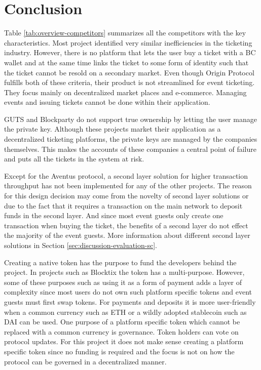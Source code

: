 \section{Conclusion}

Table \ref{tab:overview-competitors} summarizes all the competitors with the key characteristics. Most project identified very similar inefficiencies in the ticketing industry. However, there is no platform that lets the user buy a ticket with a BC wallet and at the same time links the ticket to some form of identity such that the ticket cannot be resold on a secondary market. Even though Origin Protocol fulfills both of these criteria, their product is not streamlined for event ticketing. They focus mainly on decentralized market places and e-commerce. Managing events and issuing tickets cannot be done within their application.

GUTS and Blockparty do not support true ownership by letting the user manage the private key. Although these projects market their application as a decentralized ticketing platforms, the private keys are managed by the companies themselves. This makes the accounts of these companies a central point of failure and puts all the tickets in the system at risk.

Except for the Aventus protocol, a second layer solution for higher transaction throughput has not been implemented for any of the other projects. The reason for this design decision may come from the novelty of second layer solutions or due to the fact that it requires a transaction on the main network to deposit funds in the second layer. And since most event guests only create one transaction when buying the ticket, the benefits of a second layer do not effect the majority of the event guests. More information about different second layer solutions in Section \ref{sec:discussion-evaluation-sc}.

Creating a native token has the purpose to fund the developers behind the project. In projects such as Blocktix the token has a multi-purpose. However, some of these purposes such as using it as a form of payment adds a layer of complexity since most users do not own such platform specific tokens and event guests must first swap tokens. For payments and deposits it is more user-friendly when a common currency such as ETH or a wildly adopted stablecoin such as DAI can be used. One purpose of a platform specific token which cannot be replaced with a common currency is governance. Token holders can vote on protocol updates. For this project it does not make sense creating a platform specific token since no funding is required and the focus is not on how the protocol can be governed in a decentralized manner.

